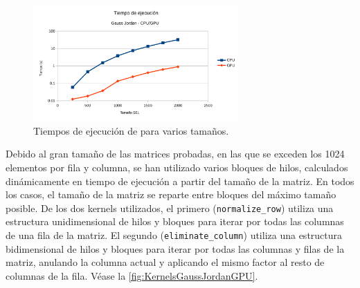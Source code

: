 \begin{figure}[h]
    \centering
    \includegraphics[width=0.7\textwidth]{img/EQ_GPU_TIME.pdf}
    \caption{Tiempos de ejecución de para varios tamaños.}
    \label{fig:gpu_time}
\end{figure}

Debido al gran tamaño de las matrices probadas,
en las que se exceden los 1024 elementos por fila y columna,
se han utilizado varios bloques de hilos,
calculados dinámicamente en tiempo de ejecución
a partir del tamaño de la matriz.
En todos los casos, el tamaño de la matriz se reparte entre bloques
del máximo tamaño posible.
De los dos kernels utilizados, 
el primero (\texttt{normalize\_row})
utiliza una estructura unidimensional de hilos y bloques
para iterar por todas las columnas de una fila
de la matriz.
El segundo (\texttt{eliminate\_column})
utiliza una estructura bidimensional de hilos y bloques
para iterar por todas las columnas y filas de la matriz,
anulando la columna actual y aplicando el mismo
factor al resto de columnas de la fila.
Véase la \autoref{fig:KernelsGaussJordanGPU}.

